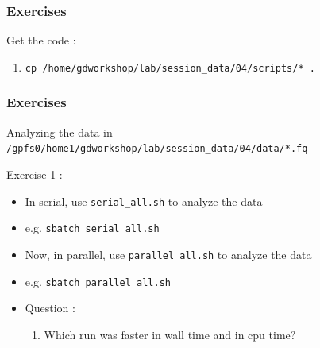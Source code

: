 \documentclass{beamer}
\newcommand{\code}[1]{\colorbox{codegray}{\texttt{#1}}}
\begin{document}
%
\begin{frame}
\frametitle{Exercises}
\small
Get the code : 
\pause
\begin{enumerate}
    \item \code{\scriptsize cp /home/gdworkshop/lab/session\_data/04/scripts/* .}
\end{enumerate}
\end{frame}



\begin{frame}
\frametitle{Exercises}
\small
Analyzing the data in \code{\scriptsize /gpfs0/home1/gdworkshop/lab/session\_data/04/data/*.fq}
\bigskip
\pause

Exercise 1 : 
\begin{itemize}
        \item In serial, use \code{\scriptsize serial\_all.sh} to analyze the data
        \pause
        \item e.g. \code{\scriptsize sbatch serial\_all.sh}
        \pause
        \item Now, in parallel, use \code{\scriptsize parallel\_all.sh} to analyze the data
        \pause
        \item e.g. \code{\scriptsize sbatch parallel\_all.sh}
        \pause
        \item Question :
        \begin{enumerate}
            \item  Which run was faster in wall time and in cpu time?
        \end{enumerate}
\end{itemize}
\end{frame}
\end{document}
